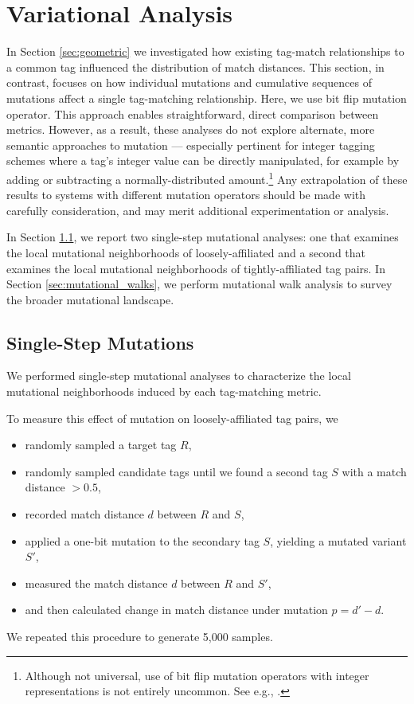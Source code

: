 \section{Variational Analysis} \label{sec:variational}

In Section \ref{sec:geometric} we investigated how existing tag-match relationships to a common tag influenced the distribution of match distances.
This section, in contrast, focuses on how individual mutations and cumulative sequences of mutations affect a single tag-matching relationship.
Here, we use bit flip mutation operator.
This approach enables straightforward, direct comparison between metrics.
However, as a result, these analyses do not explore alternate, more semantic approaches to mutation --- especially pertinent for integer tagging schemes where a tag's integer value can be directly manipulated, for example by adding or subtracting a normally-distributed amount.\footnote{
Although not universal, use of bit flip mutation operators with integer representations is not entirely uncommon.
See e.g., \cite{downing2015intelligence}.
}
Any extrapolation of these results to systems with different mutation operators should be made with carefully consideration, and may merit additional experimentation or analysis.

In Section \ref{sec:single_step}, we report two single-step mutational analyses: one that examines the local mutational neighborhoods of loosely-affiliated and a second that examines the local mutational neighborhoods of tightly-affiliated tag pairs.
In Section \ref{sec:mutational_walks}, we perform mutational walk analysis to survey the broader mutational landscape.

\subsection{Single-Step Mutations} \label{sec:single_step}



We performed single-step mutational analyses to characterize the local mutational neighborhoods induced by each tag-matching metric.

To measure this effect of mutation on loosely-affiliated tag pairs, we
\begin{itemize}
    \item randomly sampled a target tag $R$,
    \item randomly sampled candidate tags until we found a second tag $S$ with a match distance $> 0.5$,
    \item recorded match distance $d$ between $R$ and $S$,
    \item applied a one-bit mutation to the secondary tag $S$, yielding a mutated variant $S'$, 
    \item measured the match distance $d$ between $R$ and $S'$,
    \item and then calculated change in match distance under mutation $p = d' - d$.
\end{itemize}
We repeated this procedure to generate 5,000 samples.

